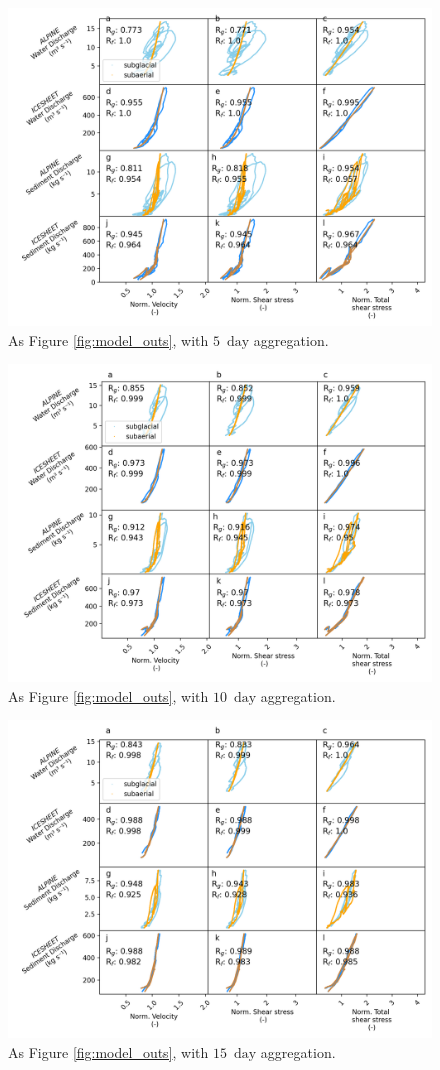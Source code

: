 \documentclass[11pt]{article}
\newcommand{\unit}[1]{$\mathrm{#1}$}
\begin{document}
\begin{center}
  \begin{figure}[h]
    \includegraphics[width=0.7\linewidth]{Fig2_5day.png}
    \caption{As Figure \ref{fig:model_outs}, with $5$ \,\unit{day} aggregation.} 
    \label{fig:model_outs_5day}
  \end{figure}
\end{center}

\begin{center}
  \begin{figure}[h]
    \includegraphics[width=0.7\linewidth]{Fig2_10day.png}
    \caption{As Figure \ref{fig:model_outs}, with $10$ \,\unit{day} aggregation.} 
    \label{fig:model_outs_10day}
  \end{figure}
\end{center}
\begin{center}
  \begin{figure}[h]
    \includegraphics[width=0.7\linewidth]{Fig2_15day.png}
    \caption{As Figure \ref{fig:model_outs}, with $15$ \,\unit{day} aggregation.} 
    \label{fig:model_outs_15day}
  \end{figure}
\end{center}
\end{document}
